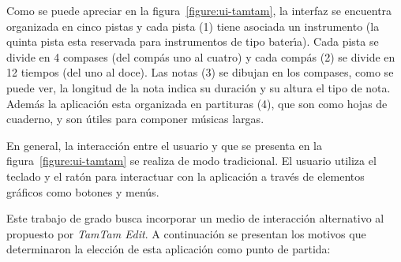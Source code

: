 Como se puede apreciar en la figura~\ref{figure:ui-tamtam}, la interfaz se encuentra organizada en 
cinco pistas y cada pista (1) tiene asociada un instrumento (la quinta pista esta reservada para
instrumentos de tipo bater{\'\i}a). Cada pista se divide en 4 
compases (del comp\'as uno al cuatro) y cada comp\'as (2) se divide en 12 tiempos (del uno al doce). 
Las notas (3) se dibujan en los compases, como se puede ver, la longitud de la nota indica su 
duraci\'on y su altura el tipo de nota. Adem\'as la aplicaci\'on esta organizada en partituras (4), que 
son como hojas de cuaderno, y son \'utiles para componer m\'usicas largas.

En general, la interacci\'on entre el usuario y  que se presenta en
la figura~\ref{figure:ui-tamtam} se realiza de modo tradicional.
El usuario utiliza el teclado y el rat\'on para interactuar con la aplicaci\'on a trav\'es de elementos
gr\'aficos como botones y men\'us. 

Este trabajo de grado busca incorporar un medio de interacci\'on alternativo al propuesto 
por \emph{TamTam Edit}. A continuaci\'on se presentan los motivos que determinaron la elecci\'on 
de esta aplicaci\'on como punto de partida:

